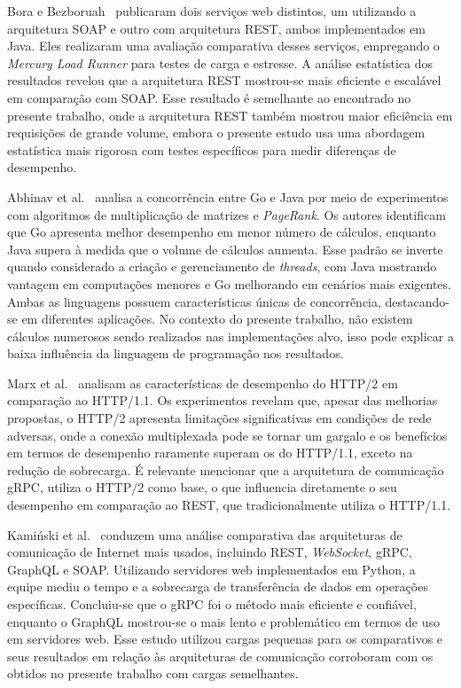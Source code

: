 Bora e Bezboruah~\cite{restSoap} publicaram dois serviços web distintos, um utilizando a arquitetura SOAP e outro com arquitetura REST, ambos implementados em Java. Eles realizaram uma avaliação comparativa desses serviços, empregando o {\em Mercury Load Runner} para testes de carga e estresse. A análise estatística dos resultados revelou que a arquitetura REST mostrou-se mais eficiente e escalável em comparação com SOAP. Esse resultado é semelhante ao encontrado no presente trabalho, onde a arquitetura REST também mostrou maior eficiência em requisições de grande volume, embora o presente estudo usa uma abordagem estatística mais rigorosa com testes específicos para medir diferenças de desempenho.

Abhinav et al.~\cite{javaVsGo} analisa a concorrência entre Go e Java por meio de experimentos com algoritmos de multiplicação de matrizes e {\em PageRank}. Os autores identificam que Go apresenta melhor desempenho em menor número de cálculos, enquanto Java supera à medida que o volume de cálculos aumenta. Esse padrão se inverte quando considerado a criação e gerenciamento de {\em threads}, com Java mostrando vantagem em computações menores e Go melhorando em cenários mais exigentes. Ambas as linguagens possuem características únicas de concorrência, destacando-se em diferentes aplicações.
{No contexto do presente trabalho, não existem cálculos numerosos sendo realizados nas implementações alvo, isso pode explicar a baixa influência da linguagem de programação nos resultados. }

Marx et al.~\cite{htt1Vshttp2} analisam as características de desempenho do HTTP/2 em comparação ao HTTP/1.1.  
Os experimentos revelam que, apesar das melhorias propostas, o HTTP/2 apresenta limitações significativas em condições de rede adversas, onde a conexão multiplexada pode se tornar um gargalo e os benefícios em termos de desempenho raramente superam os do HTTP/1.1, exceto na redução de sobrecarga. {É relevante mencionar que a arquitetura de comunicação gRPC, utiliza o HTTP/2 como base, o que influencia diretamente o seu desempenho em comparação ao REST, que tradicionalmente utiliza o HTTP/1.1.}

Kamiński et al.~\cite{kaminski2023comparative} conduzem uma análise comparativa das arquiteturas de comunicação de Internet mais usados, incluindo REST, \textit{WebSocket}, gRPC, GraphQL e SOAP. Utilizando servidores web implementados em Python, a equipe mediu o tempo e a sobrecarga de transferência de dados em operações específicas. Concluiu-se que o gRPC foi o método mais eficiente e confiável, enquanto o GraphQL mostrou-se o mais lento e problemático em termos de uso em servidores web.
{Esse estudo utilizou cargas pequenas para os comparativos e seus resultados em relação às arquiteturas de comunicação corroboram com os obtidos no presente trabalho com cargas semelhantes.}

